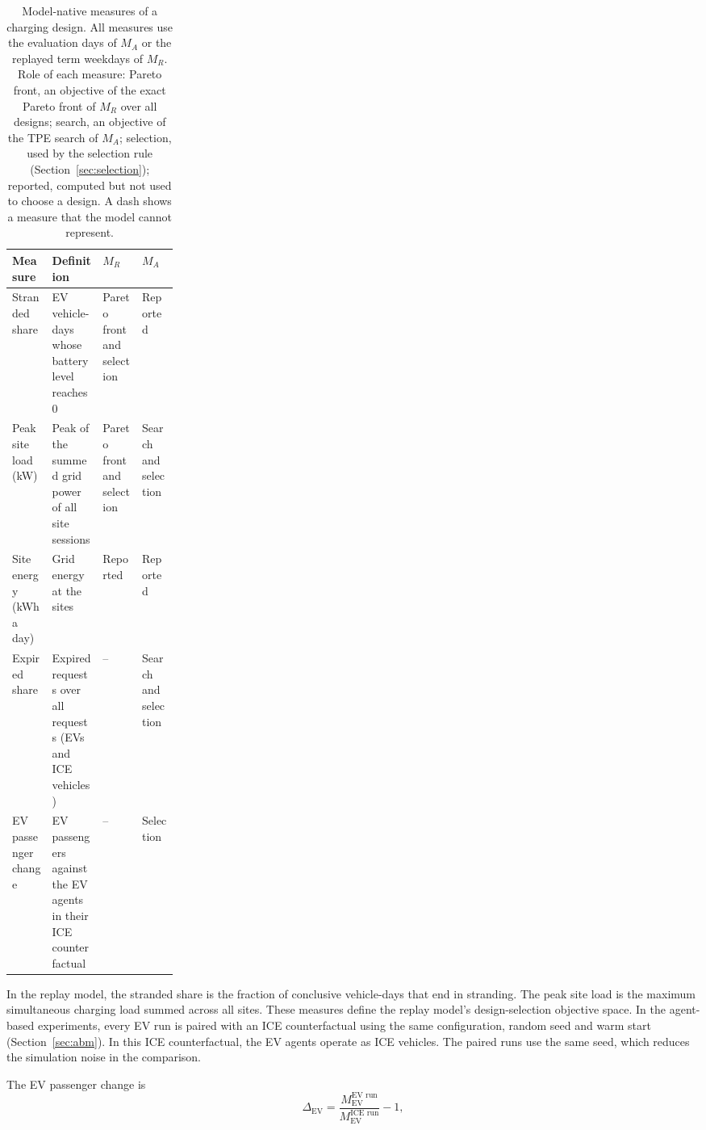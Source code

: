 \documentclass{elsarticle}
\newcommand{\MR}{\ensuremath{M_R}}
\newcommand{\MA}{\ensuremath{M_A}}
\begin{document}
\begin{table}[htbp]
    \centering
    \footnotesize
    \caption[Model-native measures of a charging design]{Model-native measures of a charging design. All measures use the evaluation days of \MA{} or the replayed term weekdays of \MR. Role of each measure: Pareto front, an objective of the exact Pareto front of \MR{} over all designs; search, an objective of the TPE search of \MA; selection, used by the selection rule (Section~\ref{sec:selection}); reported, computed but not used to choose a design. A dash shows a measure that the model cannot represent.}
    \label{tab:objectives}
    \begin{tabularx}{\linewidth}{@{}>{\raggedright\arraybackslash}p{0.24\linewidth}Xll@{}}
        \toprule
        \textbf{Measure} & \textbf{Definition} & \textbf{\MR} & \textbf{\MA} \\
        \midrule
        Stranded share & EV vehicle-days whose battery level reaches 0 & Pareto front and selection & Reported \\
        Peak site load (kW) & Peak of the summed grid power of all site sessions & Pareto front and selection & Search and selection \\
        Site energy (kWh a day) & Grid energy at the sites & Reported & Reported \\
        Expired share & Expired requests over all requests (EVs and ICE vehicles) & -- & Search and selection \\
        EV passenger change & EV passengers against the EV agents in their ICE counterfactual & -- & Selection \\
        \bottomrule
    \end{tabularx}
\end{table}

In the replay model, the stranded share is the fraction of conclusive vehicle-days that end in stranding. The peak site load is the maximum simultaneous charging load summed across all sites. These measures define the replay model's design-selection objective space. In the agent-based experiments, every EV run is paired with an ICE counterfactual using the same configuration, random seed and warm start (Section~\ref{sec:abm}). In this ICE counterfactual, the EV agents operate as ICE vehicles. The paired runs use the same seed, which reduces the simulation noise in the comparison.

The EV passenger change is
\begin{equation}
    \Delta_{\mathrm{EV}} = \frac{M_{\mathrm{EV}}^{\text{EV run}}}{M_{\mathrm{EV}}^{\text{ICE run}}} - 1,
\end{equation}
\end{document}
